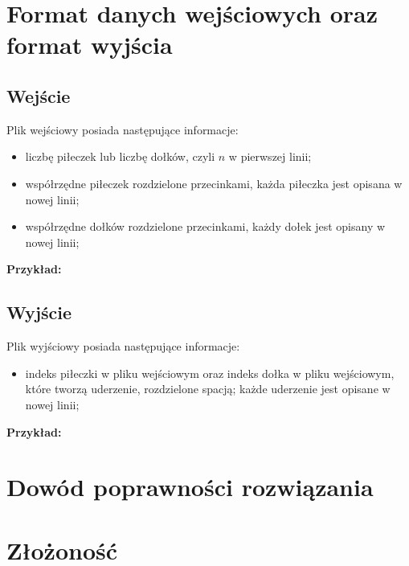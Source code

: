 \documentclass[10pt,a4paper]{article}
\begin{document}
	\section{Format danych wejściowych oraz format wyjścia}
	
	\subsection{Wejście}
	
	Plik wejściowy posiada następujące informacje:
	\begin{itemize}
		\item liczbę piłeczek lub liczbę dołków, czyli $n$ w pierwszej linii;
		\item współrzędne piłeczek rozdzielone przecinkami, każda piłeczka jest opisana w nowej linii;
		\item współrzędne dołków rozdzielone przecinkami, każdy dołek jest opisany w nowej linii;
	\end{itemize}

	\textbf{Przykład:} 
	
	\subsection{Wyjście}
	
	Plik wyjściowy posiada następujące informacje:
	\begin{itemize}
		\item indeks piłeczki w pliku wejściowym oraz indeks dołka w pliku wejściowym, które tworzą uderzenie, rozdzielone spacją; każde uderzenie jest opisane w nowej linii;
	\end{itemize}
	
	\textbf{Przykład:} 
	
	\section{Dowód poprawności rozwiązania}
	
	
	\section{Złożoność}
	
\end{document}
